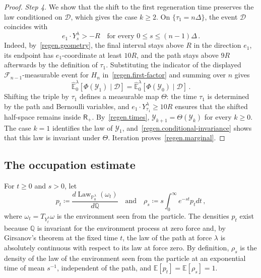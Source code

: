 \documentclass[11pt]{amsart}
\theoremstyle{definition}
\theoremstyle{remark}
\numberwithin{equation}{section}
\newcommand{\E}{\mathbb E}
\newcommand{\Q}{\mathbb Q}
\begin{document}
\begin{proof}
\emph{Step 4.} We show that the shift to the first regeneration time preserves the law conditioned on $\mathcal D$, which gives the case $k\geq2$. On $\{\tau_1=n\Delta\}$, the event $\mathcal D$ coincides with
\begin{equation*}
 e_1\cdot Y^\lambda_s>-R
 \quad\text{for every }0\leq s\leq(n-1)\Delta\, .
\end{equation*}
Indeed, by~\eqref{regen.geometry}, the final interval stays above $R$ in the direction $e_1$, its endpoint has $e_1$-coordinate at least $10R$, and the path stays above $9R$ afterwards by the definition of $\tau_1$. Substituting the indicator of the displayed $\mathcal F_{n-1}$-measurable event for $H_n$ in~\eqref{regen.first-factor} and summing over $n$ gives
\begin{equation}\label{regen.conditional-invariance}
 \widehat{\mathbb E}^\lambda_0[
 \Phi(\mathcal Y_1)\mid\mathcal D]
 =\widehat{\mathbb E}^\lambda_0[
 \Phi(\mathcal Y_0)\mid\mathcal D]\, .
\end{equation}
Shifting the triple by $\tau_1$ defines a measurable map $\Theta$: the time $\tau_1$ is determined by the path and Bernoulli variables, and $e_1\cdot Y^\lambda_{\tau_1}\geq10R$ ensures that the shifted half-space remains inside $\mathsf R_+$. By~\eqref{regen.times}, $\mathcal Y_{k+1}=\Theta(\mathcal Y_k)$ for every $k\geq0$. The case $k=1$ identifies the law of $\mathcal Y_1$, and~\eqref{regen.conditional-invariance} shows that this law is invariant under $\Theta$. Iteration proves~\eqref{regen.marginal}.
\end{proof}


\subsection{The occupation estimate}\label{regen.occupation-sec}

For $t\geq0$ and $s>0$, let
\begin{equation}\label{regen.rho}
 p_t\coloneqq\frac{d\operatorname{Law}_{\mathbb P^\lambda_0}(\omega_t)}{d\Q}
 \quad\text{and}\quad
 \rho_s\coloneqq s\int_0^\infty e^{-st}p_tdt\, ,
\end{equation}
where $\omega_t=T_{Y^\lambda_t}\omega$ is the environment seen from the particle. The densities $p_t$ exist because $\Q$ is invariant for the environment process at zero force and, by Girsanov's theorem at the fixed time $t$, the law of the path at force $\lambda$ is absolutely continuous with respect to its law at force zero. By definition, $\rho_s$ is the density of the law of the environment seen from the particle at an exponential time of mean $s^{-1}$, independent of the path, and $\E[p_t]=\E[\rho_s]=1$.
\end{document}
